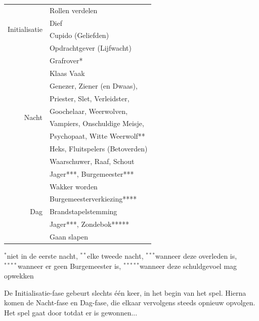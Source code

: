 \documentclass[12pt]{article}
\begin{document}
    \begin{center}
      \begin{tabular}{r|l}
        \multirow{4}{*}{Initialisatie} & Rollen verdelen \\ \cline{2-2}
         & Dief \\ \cline{2-2}
         & Cupido (Geliefden) \\ \cline{2-2}
         & Opdrachtgever (Lijfwacht) \\
        \hline
        \hline
        \multirow{10}{*}{Nacht} & Grafrover* \\ \cline{2-2}
         & Klaas Vaak \\ \cline{2-2}
         & Genezer, Ziener (en Dwaas), \\
         & Priester, Slet, Verleidster, \\
         & Goochelaar, Weerwolven, \\
         & Vampiers, Onschuldige Meisje, \\
         & Psychopaat, Witte Weerwolf** \\ \cline{2-2}
         & Heks, Fluitspelers (Betoverden)\\ \cline{2-2}
         & Waarschuwer, Raaf, Schout \\ \cline{2-2}
         & Jager***, Burgemeester*** \\
        \hline
        \multirow{5}{*}{Dag} & Wakker worden \\ \cline{2-2}
         & Burgemeesterverkiezing**** \\ \cline{2-2}
         & Brandstapelstemming \\ \cline{2-2}
         & Jager***, Zondebok***** \\ \cline{2-2}
         & Gaan slapen \\
      \end{tabular}
      
      {\scriptsize \noindent $^{\ast}$niet in de eerste nacht, 
      $^{\ast\ast}$elke tweede nacht, 
      $^{\ast\ast\ast}$wanneer deze overleden is, \\
      $^{\ast\ast\ast\ast}$wanneer er geen Burgemeester is,
      $^{\ast\ast\ast\ast\ast}$wanneer deze schuldgevoel mag opwekken}
      
    \end{center}
    
    De Initialisatie-fase gebeurt slechts \'e\'en keer, in het begin van het spel. Hierna komen de Nacht-fase en Dag-fase, die elkaar vervolgens steeds opnieuw opvolgen. Het spel gaat door totdat er is gewonnen...
    
\end{document}

